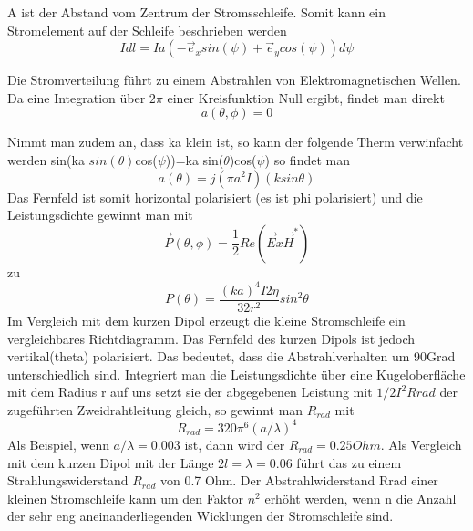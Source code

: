 A ist der Abstand vom Zentrum der Stromsschleife. Somit kann ein Stromelement auf der Schleife beschrieben werden
\begin{equation}
I dl= Ia(- \vec e_{x}sin(\psi)+\vec e_{y}cos(\psi))d\psi
\end{equation}
 
Die Stromverteilung führt zu einem Abstrahlen von Elektromagnetischen Wellen.
Da eine Integration über $2\pi $ einer Kreisfunktion Null ergibt, findet man direkt 
\begin{equation}
a(\theta, \phi) =0
\end{equation}

Nimmt man zudem an, dass ka klein ist, so kann der folgende Therm verwinfacht werden sin(ka $sin(\theta)$cos($\psi$))=ka sin($\theta$)cos($\psi$) so findet man 
\begin{equation}
a(\theta)=j(\pi a^{2}I)(k sin \theta)
\end{equation}
Das Fernfeld ist somit horizontal polarisiert (es ist phi polarisiert) und die Leistungsdichte gewinnt man mit 
\begin{equation}
\vec P(\theta,\phi)=\frac{1}{2}Re(\vec E x \vec H^*)
\end{equation}
zu
\begin{equation}
P(\theta)=\frac{(ka)^{4}I{2}\eta}{32r^{2}}sin^{2}\theta
\end{equation}
Im Vergleich mit dem kurzen Dipol erzeugt die kleine Stromschleife ein vergleichbares Richtdiagramm. Das Fernfeld des kurzen Dipols ist jedoch vertikal(theta) polarisiert. Das bedeutet, dass die Abstrahlverhalten um 90Grad unterschiedlich sind. Integriert man die Leistungsdichte über eine Kugeloberfläche mit dem Radius r  auf uns setzt sie der abgegebenen Leistung mit $1/2 I^{2}Rrad $ der zugeführten Zweidrahtleitung gleich, so gewinnt man $R_{rad}$ mit 
\begin{equation}
R_{rad} = 320\pi^{6} (a/\lambda)^{4}
\end{equation}
Als Beispiel, wenn $a/\lambda = 0.003$ ist, dann wird der $R_{rad} = 0.25 Ohm$. Als Vergleich mit dem kurzen Dipol mit der Länge $2l=\lambda= 0.06$ führt das zu einem Strahlungswiderstand $R_{rad}$ von 0.7 Ohm.  Der Abstrahlwiderstand Rrad einer kleinen Stromschleife kann um den Faktor $n^{2}$ erhöht werden, wenn n die Anzahl der sehr eng aneinanderliegenden Wicklungen der Stromschleife sind. 




